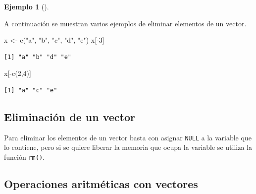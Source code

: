 \documentclass[
  a4paper,
]{scrreport}
\newenvironment{Shaded}{\begin{snugshade}}{\end{snugshade}}
\newcommand{\DecValTok}[1]{\textcolor[rgb]{0.68,0.00,0.00}{#1}}
\newcommand{\FunctionTok}[1]{\textcolor[rgb]{0.28,0.35,0.67}{#1}}
\newcommand{\NormalTok}[1]{\textcolor[rgb]{0.00,0.23,0.31}{#1}}
\newcommand{\OtherTok}[1]{\textcolor[rgb]{0.00,0.23,0.31}{#1}}
\newcommand{\SpecialCharTok}[1]{\textcolor[rgb]{0.37,0.37,0.37}{#1}}
\newcommand{\StringTok}[1]{\textcolor[rgb]{0.13,0.47,0.30}{#1}}
\theoremstyle{definition}
\newtheorem{example}{Ejemplo}[chapter]
\theoremstyle{definition}
\theoremstyle{remark}
\begin{document}
\leavevmode{}%
\begin{example}[]\label{exm-eliminar-elementos-vector}

A continuación se muestran varios ejemplos de eliminar elementos de un
vector.

\begin{Shaded}
\begin{Highlighting}[]
\NormalTok{x }\OtherTok{\textless{}{-}} \FunctionTok{c}\NormalTok{(}\StringTok{"a"}\NormalTok{, }\StringTok{"b"}\NormalTok{, }\StringTok{"c"}\NormalTok{, }\StringTok{"d"}\NormalTok{, }\StringTok{"e"}\NormalTok{)}
\NormalTok{x[}\SpecialCharTok{{-}}\DecValTok{3}\NormalTok{]}
\end{Highlighting}
\end{Shaded}

\begin{verbatim}
[1] "a" "b" "d" "e"
\end{verbatim}

\begin{Shaded}
\begin{Highlighting}[]
\NormalTok{x[}\SpecialCharTok{{-}}\FunctionTok{c}\NormalTok{(}\DecValTok{2}\NormalTok{,}\DecValTok{4}\NormalTok{)]}
\end{Highlighting}
\end{Shaded}

\begin{verbatim}
[1] "a" "c" "e"
\end{verbatim}

\end{example}

\hypertarget{eliminaciuxf3n-de-un-vector}{%
\subsection{Eliminación de un
vector}\label{eliminaciuxf3n-de-un-vector}}

Para eliminar los elementos de un vector basta con asignar \texttt{NULL}
a la variable que lo contiene, pero si se quiere liberar la memoria que
ocupa la variable se utiliza la función \texttt{rm()}.

\hypertarget{operaciones-aritmuxe9ticas-con-vectores}{%
\subsection{Operaciones aritméticas con
vectores}\label{operaciones-aritmuxe9ticas-con-vectores}}
\end{document}
